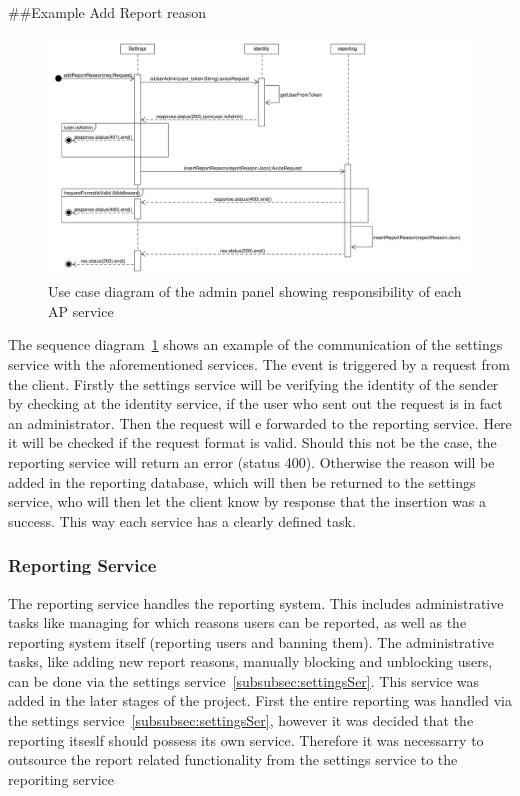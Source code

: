 \#\#Example Add Report reason
\begin{figure}[!ht]
    \centering
    \includegraphics[width=1.0\textwidth]{./images/SequenceDiagram_AddReportReason.pdf}
    \caption{Use case diagram of the admin panel showing responsibility of each AP service}
    \label{fig:addReportReason}
\end{figure}
The sequence diagram~\ref{fig:addReportReason} shows an example of the communication of the settings service with the aforementioned services.
The event is triggered by a request from the client.
Firstly the settings service will be verifying the identity of the sender by checking at the identity service, if the user who sent out the request is in fact an administrator.
Then the request will e forwarded to the reporting service. Here it will be checked if the request format is valid. Should this not be the case, the reporting service will return an error (status 400).
Otherwise the reason will be added in the reporting database, which will then be returned to the settings service, who will then let the client know by response that the insertion was a success.
This way each service has a clearly defined task.

\subsubsection{Reporting Service}
\label{subsubsec:reportingSer}
The reporting service handles the reporting system.
This includes administrative tasks like managing for which reasons users can be reported, as well as the reporting system itself (reporting users and banning them).
The administrative tasks, like adding new report reasons, manually blocking and unblocking users, can be done via the
settings service~\ref{subsubsec:settingsSer}.
This service was added in the later stages of the project.
First the entire reporting was handled via the settings service~\ref{subsubsec:settingsSer}, however it was decided that the reporting itseslf should possess its own service.
Therefore it was necessarry to outsource the report related functionality from the settings service to the reporiting service

